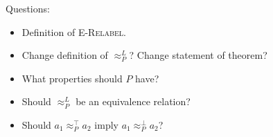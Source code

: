 \documentclass{article}
\theoremstyle{definition}
\begin{document}
\begin{flushleft}
  Questions:
\end{flushleft}

\begin{itemize}
\item Definition of \textsc{E-Relabel}.
\item Change definition of $\approx^{L}_{P}$? Change statement of theorem?
\item What properties should $P$ have?
\item Should $\approx^{L}_{P}$ be an equivalence relation?
\item Should $a_1 \approx^{\top}_{P} a_2$ imply $a_1 \approx^{\bot}_{P} a_2$?
\end{itemize}
\end{document}
